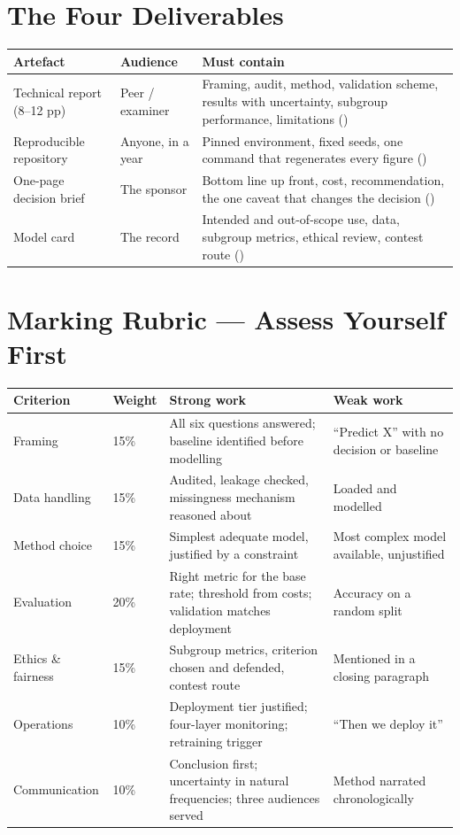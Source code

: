 \section{The Four Deliverables}

\begin{longtable}{@{}L{3.4cm}L{4.4cm}L{6.2cm}@{}}
\toprule
{}
\textbf{Artefact} & \textbf{Audience} & \textbf{Must contain} \\
\midrule
\endhead
Technical report (8--12 pp) & Peer / examiner & Framing, audit, method, validation scheme, results with uncertainty, subgroup performance, limitations () \\
Reproducible repository & Anyone, in a year & Pinned environment, fixed seeds, one command that regenerates every figure () \\
One-page decision brief & The sponsor & Bottom line up front, cost, recommendation, the one caveat that changes the decision () \\
Model card & The record & Intended and out-of-scope use, data, subgroup metrics, ethical review, contest route () \\
\bottomrule
\end{longtable}

\section{Marking Rubric --- Assess Yourself First}

\begin{longtable}{@{}L{3.6cm}L{1.6cm}L{4.3cm}L{4.3cm}@{}}
\toprule
{}
\textbf{Criterion} & \textbf{Weight} & \textbf{Strong work} & \textbf{Weak work} \\
\midrule
\endhead
Framing & 15\% & All six questions answered; baseline identified before modelling & ``Predict X'' with no decision or baseline \\
Data handling & 15\% & Audited, leakage checked, missingness mechanism reasoned about & Loaded and modelled \\
Method choice & 15\% & Simplest adequate model, justified by a constraint & Most complex model available, unjustified \\
Evaluation & 20\% & Right metric for the base rate; threshold from costs; validation matches deployment & Accuracy on a random split \\
Ethics \& fairness & 15\% & Subgroup metrics, criterion chosen and defended, contest route & Mentioned in a closing paragraph \\
Operations & 10\% & Deployment tier justified; four-layer monitoring; retraining trigger & ``Then we deploy it'' \\
Communication & 10\% & Conclusion first; uncertainty in natural frequencies; three audiences served & Method narrated chronologically \\
\bottomrule
\end{longtable}

